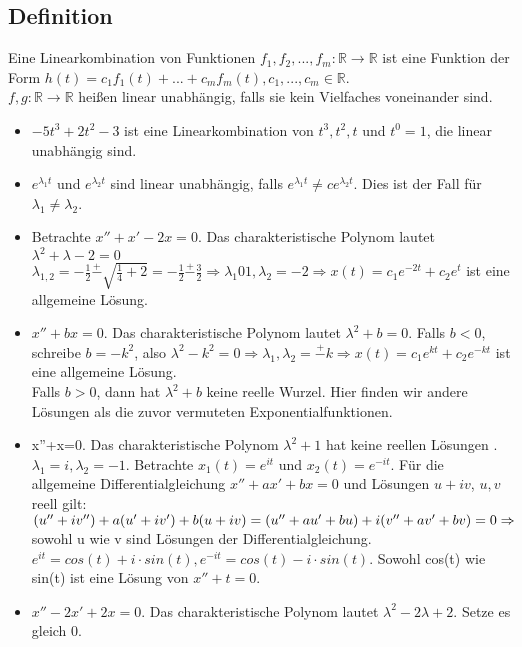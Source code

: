 \documentclass[12pt,a4paper]{article}
\newcommand{\Lsg}{Lösung }
\newcommand{\LSG}{Lösungen }
\begin{document}
\subsection{Definition}
Eine Linearkombination von Funktionen $f_1, f_2, ..., f_m: \mathbb{R} \rightarrow \mathbb{R}$ ist eine Funktion der Form $h(t) = c_1f_1(t) + ... + c_mf_m(t), c_1,...,c_m \in \mathbb{R}$. \\
$f, g: \mathbb{R} \rightarrow \mathbb{R}$ heißen linear unabhängig, falls sie kein Vielfaches voneinander sind.
\begin{itemize}
\item $-5t^3+2t^2-3$ ist eine Linearkombination von $t^3, t^2, t$ und $t^0=1$, die linear unabhängig sind.
\item $e^{\lambda_1 t}$ und $e^{\lambda_2 t}$ sind linear unabhängig, falls $e^{\lambda_1 t} \neq c e^{\lambda_2 t}$. Dies ist der Fall für $\lambda_1 \neq \lambda_2$.
\item Betrachte $x''+x'-2x=0$. Das charakteristische Polynom lautet $\lambda^2+\lambda-2=0$ \\
$\lambda_{1,2} = - \frac{1}{2} \overset{+}{-} \sqrt{\frac{1}{4}+2} = -\frac{1}{2} \overset{+}{-} \frac{3}{2} \Rightarrow \lambda_1 0 1, \lambda_2 = -2 \Rightarrow x(t) = c_1e^{-2t} + c_2 e^t$ ist eine allgemeine Lösung.
\item $x''+bx=0$. Das charakteristische Polynom lautet $\lambda^2+b=0$. Falls $b<0$, schreibe $b=-k^2$, also $\lambda^2-k^2=0 \Rightarrow \lambda_1, \lambda_2 = \overset{+}{-} k \Rightarrow x(t) = c_1e^{kt}+c_2e^{-kt}$ ist eine allgemeine Lösung. \\
Falls $b>0$, dann hat $\lambda^2+b$ keine reelle Wurzel. Hier finden wir andere Lösungen als die zuvor vermuteten Exponentialfunktionen.
\item x''+x=0. Das charakteristische Polynom $\lambda^2+1$ hat keine reellen \LSG. $\lambda_1 = i, \lambda_2 = -1$. Betrachte $x_1(t) = e^{it}$ und $x_2(t) = e^{-it}$.
Für die allgemeine Differentialgleichung $x''+ax'+bx=0$ und Lösungen $u + iv$, $u,v$ reell gilt: \\
$(u''+iv'') + a (u'+iv') + b (u+iv) = (u''+au'+bu) + i(v''+av'+bv) = 0 \\ \Rightarrow$ sowohl u wie v sind Lösungen der Differentialgleichung. \\
$e^{it} = cos(t) + i \cdot sin(t), e^{-it}=cos(t) -i \cdot sin(t)$. Sowohl cos(t) wie sin(t) ist eine \Lsg von $x''+t=0$.
\item $x''-2x'+2x=0$. Das charakteristische Polynom lautet $\lambda^2-2\lambda+2$. Setze es gleich 0. \\

\end{itemize}
\end{document}
